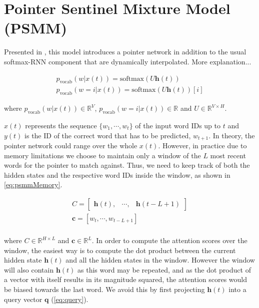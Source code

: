 \cite{grave2016improving}

\section{Pointer Sentinel Mixture Model (PSMM)}
\label{sec:pointerMixture}

Presented in \cite{merity2016pointer}, this model introduces a pointer network in addition to the usual softmax-RNN component that are dynamically interpolated. More explanation...

\begin{equation} \label{eq:psmmMemory}
	\begin{gathered}
		p_{\text{vocab}}(w|x(t)) = \text{softmax}(U\mathbf{h}(t))  \\
		p_{\text{vocab}}(w=i|x(t)) = \text{softmax}(U\mathbf{h}(t))[i] 
	\end{gathered}	
\end{equation}

where $p_{\text{vocab}}(w|x(t)) \in \mathbb{R}^{V}$, $p_{\text{vocab}}(w=i|x(t)) \in \mathbb{R}$ and $U \in \mathbb{R}^{V \times H}$.

$x(t)$ represents the sequence $\{w_1, \cdots , w_t\}$ of the input word IDs up to $t$  and $y(t)$ is the ID of the correct word that has to be predicted, $w_{t+1}$. In theory, the pointer network could range over the whole $x(t)$. However, in practice due to memory limitations we choose to maintain only a window of the $L$ most recent words for the pointer to match against. Thus, we need to keep track of both the hidden states and the respective word IDs inside the window, as shown in \autoref{eq:psmmMemory}.

\begin{equation}
	\begin{gathered}
		C = \begin{bmatrix} \mathbf{h}(t), & \cdots, & \mathbf{h}(t-L+1) \end{bmatrix} \\
		\mathbf{c} = [w_t, \cdots, w_{t-L+1}] \\
	\end{gathered}
\end{equation}

where $C \in \mathbb{R}^{H \times L}$ and $\mathbf{c} \in \mathbb{R}^{L}$. In order to compute the attention scores over the window, the easiest way is to compute the dot product between the current hidden state $\mathbf{h}(t)$ and all the hidden states in the window. However the window will also contain $\mathbf{h}(t)$ as this word may be repeated, and as the dot product of a vector with itself results in its magnitude squared, the attention scores would be biased towards the last word. We avoid this by first projecting $\mathbf{h}(t)$ into a query vector $\mathbf{q}$ (\autoref{eq:query}).

